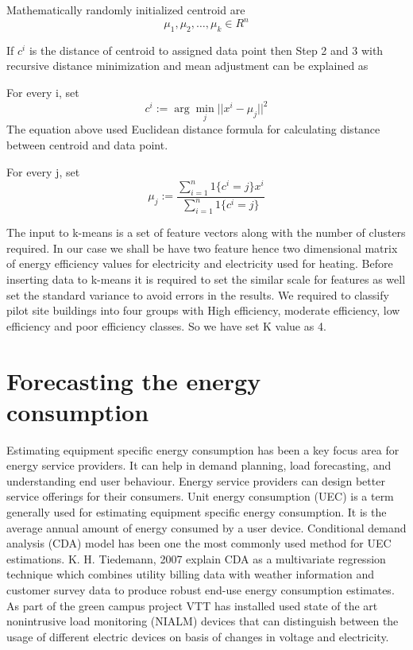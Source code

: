Mathematically randomly initialized centroid are  
$${\mu_1,\mu_2,\dotsc,\mu_k}  \in R^{n}$$


If \(c^{i}\) is the distance of centroid to assigned data point then Step 2 and 3 with recursive distance minimization and mean adjustment can be explained as 

For every i, set 
\begin{equation}
c^{i} := \arg\min_j || x^{i} - \mu_j||^2
\end{equation} 
The equation above used Euclidean distance formula for calculating distance between centroid and data point. 

For every j, set
\begin{equation}
\mu_{j} := \frac{\sum\limits_{i=1}^n 1\{c^{i} =j\}x^{i}}{\sum\limits_{i=1}^n 1\{c^{i}=j\}}
\end{equation}

The input to k-means is a set of feature vectors along with the number of clusters required. In our case we shall be have two feature hence two dimensional matrix of energy efficiency values for electricity and electricity used for heating. Before inserting data to k-means it is required to set the similar scale for features as well set the standard variance to avoid errors in the results. We required to classify pilot site buildings into four groups with High efficiency, moderate efficiency, low efficiency and poor efficiency classes. So we have set K value as 4.

\section{Forecasting the energy consumption}\label{predict}
Estimating equipment specific energy consumption has been a key focus area for energy service providers. It can help in demand planning, load forecasting, and understanding end user behaviour.  Energy service providers can design better service offerings for their consumers. Unit energy consumption (UEC) is a term generally used for estimating equipment specific energy consumption. It is the average annual amount of energy consumed by a user device. Conditional demand analysis (CDA) model has been one the most commonly used method for UEC estimations. K. H. Tiedemann, 2007 explain CDA as a multivariate regression technique which combines utility billing data with weather information and customer survey data to produce robust end-use energy consumption estimates\cite{tiedemann2007using}. As part of the green campus project VTT has installed used state of the art nonintrusive load monitoring (NIALM)\cite{hart1992nonintrusive} devices that can distinguish between the usage of different electric devices on basis of changes in voltage and electricity. 


